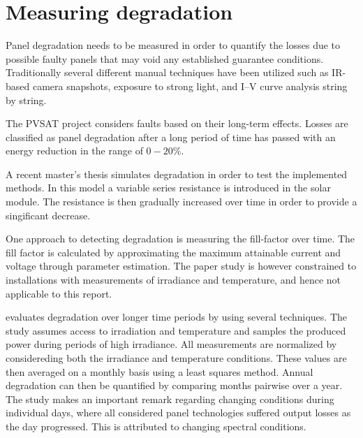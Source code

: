 \section{Measuring degradation}
Panel degradation needs to be measured in order to quantify the losses due to possible faulty panels that may void any established guarantee conditions.
Traditionally several different manual techniques have been utilized\cite{Munoz2011} such as IR-based camera snapshots, exposure to strong light, and I–V curve analysis string by string.

The PVSAT project\cite{Stettler2005} considers faults based on their long-term effects.
Losses are classified as panel degradation after a long period of time has passed with an energy reduction in the range of $0-20\%$.

A recent master's thesis\cite{Zhao2010thesis} simulates degradation in order to test the implemented methods.
In this model a variable series resistance is introduced in the solar module.
The resistance is then gradually increased over time in order to provide a singificant decrease.

One approach to detecting degradation is measuring the fill-factor over time\cite{Raina2013}.
The fill factor is calculated by approximating the maximum attainable current and voltage through parameter estimation.
The paper study is however constrained to installations with measurements of irradiance and temperature, and hence not applicable to this report.

\cite{Makrides2010} evaluates degradation over longer time periods by using several techniques.
The study assumes access to irradiation and temperature and samples the produced power during periods of high irradiance.
All measurements are normalized by considereding both the irradiance and temperature conditions.
These values are then averaged on a monthly basis using a least squares method.
Annual degradation can then be quantified by comparing months pairwise over a year.
The study makes an important remark regarding changing conditions during individual days, where all considered panel technologies suffered output losses as the day progressed.
This is attributed to changing spectral conditions.









